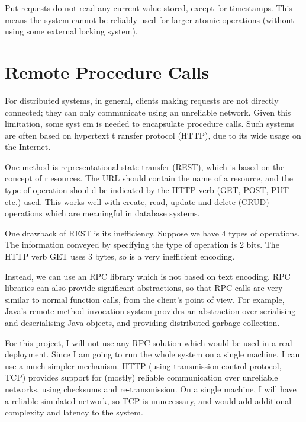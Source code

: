 \documentclass[12pt,a4paper,twoside,openright]{report}
\begin{document}
Put requests do not read any current value stored, except for timestamps. This means the system cannot be reliably used for larger atomic operations (without using some external locking system). %

\section{Remote Procedure Calls}


For distributed systems, in general, clients making requests are not directly connected;
 they can only communicate using an unreliable network. Given this limitation, some syst
em is needed to encapsulate procedure calls. Such systems are often based on hypertext t
ransfer protocol (HTTP), due to its wide usage on the Internet.

One method is representational state transfer (REST), which is based on the concept of r
esources. The URL should contain the name of a resource, and the type of operation shoul
d be indicated by the HTTP verb (GET, POST, PUT etc.) used. This works well with create, read, update and delete (CRUD) operations which are meaningful in database systems.

One drawback of REST is its inefficiency. Suppose we have 4 types of operations. The information conveyed by specifying the type of operation is 2 bits. The HTTP verb GET uses 3 bytes, so is a very inefficient encoding.

Instead, we can use an RPC library which is not based on text encoding. RPC libraries can also provide significant abstractions, so that RPC calls are very similar to normal function calls, from the client's point of view. For example, Java's remote method invocation system provides an abstraction over serialising and deserialising Java objects, and providing distributed garbage collection.

For this project, I will not use any RPC solution which would be used in a real deployment. Since I am going to run the whole system on a single machine, I can use a much simpler mechanism. HTTP (using transmission control protocol, TCP) provides support for (mostly) reliable communication over unreliable networks, using checksums and re-transmission. On a single machine, I will have a reliable simulated network, so TCP is unnecessary, and would add additional complexity and latency to the system.
\end{document}
